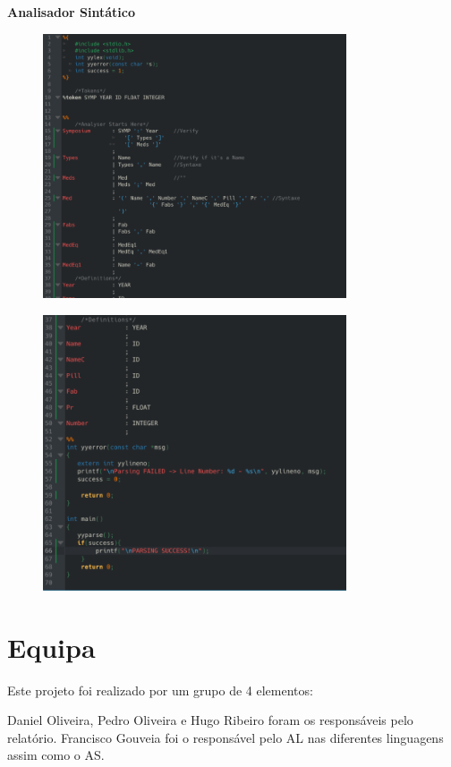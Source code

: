 \documentclass{article}
\begin{document}
\pagebreak

\large\textbf{Analisador Sintático}



\begin{figure}[!h]
\centering
\includegraphics[width=0.8\textwidth]{AS1.png}
\end{figure}

\begin{figure}[!h]
\centering
\includegraphics[width=0.8\textwidth]{AS2.png}
\end{figure}



\pagebreak



\vspace*{2cm}\section{Equipa}
Este projeto foi realizado por um grupo de 4 elementos:\\
\par Daniel Oliveira, Pedro Oliveira e Hugo Ribeiro foram os responsáveis pelo relatório. Francisco Gouveia foi o responsável pelo AL nas diferentes linguagens assim como o AS.
\vspace*{\fill}
\end{document}
